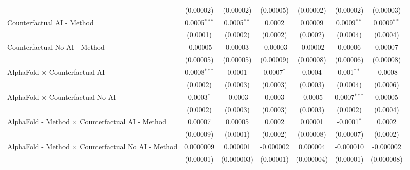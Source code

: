 \begin{tabular}{lcccccc}
                                                              & (0.00002)      & (0.00002)     & (0.00005)      & (0.00002)  & (0.00002)       & (0.00003)\\   
   Counterfactual AI - Method                                 & 0.0005$^{***}$ & 0.0005$^{**}$ & 0.0002         & 0.00009    & 0.0009$^{**}$   & 0.0009$^{**}$\\   
                                                              & (0.0001)       & (0.0002)      & (0.0002)       & (0.0002)   & (0.0004)        & (0.0004)\\   
   Counterfactual No AI - Method                              & -0.00005       & 0.00003       & -0.00003       & -0.00002   & 0.00006         & 0.00007\\   
                                                              & (0.00005)      & (0.00005)     & (0.00009)      & (0.00008)  & (0.00006)       & (0.00008)\\   
   AlphaFold $\times$ Counterfactual AI                       & 0.0008$^{***}$ & 0.0001        & 0.0007$^{*}$   & 0.0004     & 0.001$^{**}$    & -0.0008\\   
                                                              & (0.0002)       & (0.0003)      & (0.0003)       & (0.0003)   & (0.0004)        & (0.0006)\\   
   AlphaFold $\times$ Counterfactual No AI                    & 0.0003$^{*}$   & -0.0003       & 0.0003         & -0.0005    & 0.0007$^{***}$  & 0.00005\\   
                                                              & (0.0002)       & (0.0003)      & (0.0003)       & (0.0003)   & (0.0002)        & (0.0004)\\   
   AlphaFold - Method $\times$ Counterfactual AI - Method     & 0.00007        & 0.00005       & 0.0002         & 0.00001    & -0.0001$^{*}$   & 0.0002\\   
                                                              & (0.00009)      & (0.0001)      & (0.0002)       & (0.00008)  & (0.00007)       & (0.0002)\\   
   AlphaFold - Method $\times$ Counterfactual No AI - Method  & 0.0000009      & 0.000001      & -0.000002      & 0.000004   & -0.000010       & -0.000002\\   
                                                              & (0.00001)      & (0.000003)    & (0.00001)      & (0.000004) & (0.00001)       & (0.000008)\\   
   \midrule

\end{tabular}
